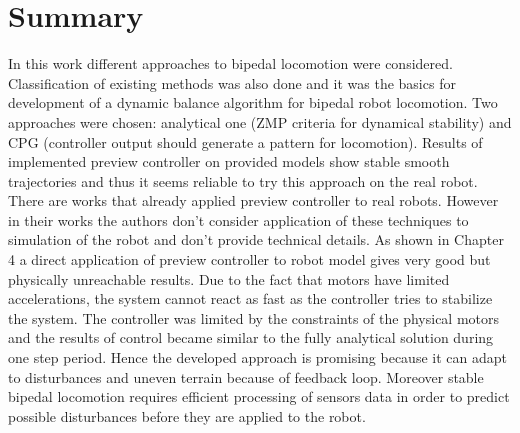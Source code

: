 \documentclass[12pt,a4paper]{report}
\begin{document}
	\chapter{Summary}
		In this work different approaches to bipedal locomotion were considered. Classification of existing methods was also done and it was the basics for development of a dynamic balance algorithm for bipedal robot locomotion. Two approaches were chosen: analytical one (ZMP criteria for dynamical stability) and CPG (controller output should generate a pattern for locomotion). Results of implemented preview controller on provided models show stable smooth trajectories and thus it seems reliable to try this approach on the real robot. There are works \cite{kajita2003biped, audren2014model} that already applied preview controller to real robots. However in their works the authors don't consider application of these techniques to simulation of the robot and don't provide technical details. As shown in Chapter 4 a direct application of preview controller to robot model gives very good but physically unreachable results. Due to the fact that motors have limited accelerations, the system cannot react as fast as the controller tries to stabilize the system. The controller was limited by the constraints of the physical motors and the results of control became similar to the fully analytical solution during one step period. Hence the developed approach is promising because it can adapt to disturbances and uneven terrain because of feedback loop.
		Moreover stable bipedal locomotion requires efficient processing of sensors data in order to predict possible disturbances before they are applied to the robot.
			
	
	
	
\end{document}

